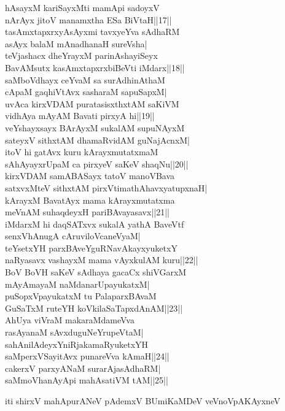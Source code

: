 \documentclass{article}
\begin{document}
hAsayxM kariSayxMti mamApi sadoyxV\\
nArAyx jitoV manamxtha ESa BiVtaH||17||\\
tasAmxtapxrxyAsAyxmi tavxyeYva sAdhaRM\\
asAyx balaM mAnadhanaH sureVsha|\\
teVjashacx dheYrayxM parinAshayiSeyx\\
BavAMsutx kasAmxtapxrxbiBeVti iMdarx||18||\\
saMboVdhayx ceYvaM sa surAdhinAthaM\\
cApaM gaqhiVtAvx sasharaM sapuSapxM|\\
uvAca kirxVDAM puratasisxthxtAM saKiVM\\
vidhAya mAyAM Bavati pirxyA hi||19||\\
veYshayxsayx BArAyxM sukalAM supuNAyxM\\
sateyxV sithxtAM dhamaRvidAM guNajAcnxM|\\
itoV hi gatAvx kuru kArayxmutatxmaM\\
sAhAyayxrUpaM ca pirxyeV saKeV shaqNu||20||\\
kirxVDAM samABASayx tatoV manoVBava\\
satxvxMteV sithxtAM pirxVtimathAhavxyatupxnaH|\\
kArayxM BavatAyx mama kArayxmutatxma\\
meVnAM suhaqdeyxH pariBAvayasavx||21||\\
iMdarxM hi daqSATxvx sukalA yathA BaveVtf\\
senxVhAnugA cAruviloVcaneVyaM|\\
teYsetxYH parxBAveYguRNavAkayxyuketxY\\
naRyasavx vashayxM mama vAyxkulAM kuru||22||\\
BoV BoVH saKeV sAdhaya gacaCx shiVGarxM\\
mAyAmayaM naMdanarUpayukatxM|\\
puSopxVpayukatxM tu PalaparxBAvaM\\
GuSaTxM ruteYH koVkilaSaTapxdAnAM||23||\\
AhUya viVraM makaraMdameVva\\
rasAyanaM sAvxduguNeYrupeVtaM|\\
sahAnilAdeyxYniRjakamaRyuketxYH\\
saMperxVSayitAvx punareVva kAmaH||24||\\
cakerxV parxyANaM surarAjasAdhaRM|\\
saMmoVhanAyApi mahAsatiVM tAM||25||

\begin{center}
iti shirxV mahApurANeV pAdemxV BUmiKaMDeV veVnoVpAKAyxneV
\end{center}
\end{document}
